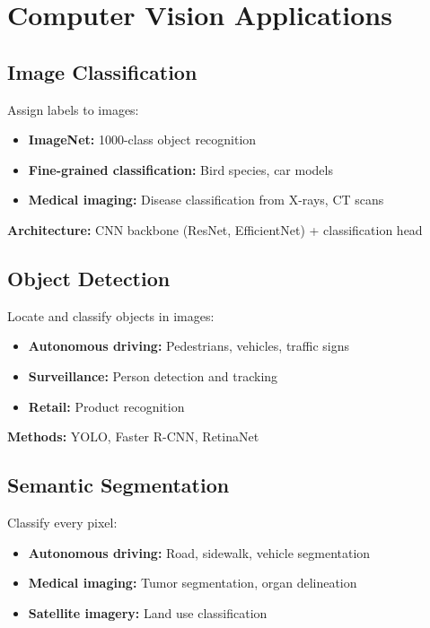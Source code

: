 
\section{Computer Vision Applications}
\label{sec:cv-applications}

\subsection{Image Classification}

Assign labels to images:
\begin{itemize}
    \item \textbf{ImageNet:} 1000-class object recognition
    \item \textbf{Fine-grained classification:} Bird species, car models
    \item \textbf{Medical imaging:} Disease classification from X-rays, CT scans
\end{itemize}

\textbf{Architecture:} CNN backbone (ResNet, EfficientNet) + classification head

\subsection{Object Detection}

Locate and classify objects in images:
\begin{itemize}
    \item \textbf{Autonomous driving:} Pedestrians, vehicles, traffic signs
    \item \textbf{Surveillance:} Person detection and tracking
    \item \textbf{Retail:} Product recognition
\end{itemize}

\textbf{Methods:} YOLO, Faster R-CNN, RetinaNet

\subsection{Semantic Segmentation}

Classify every pixel:
\begin{itemize}
    \item \textbf{Autonomous driving:} Road, sidewalk, vehicle segmentation
    \item \textbf{Medical imaging:} Tumor segmentation, organ delineation
    \item \textbf{Satellite imagery:} Land use classification
\end{itemize}

